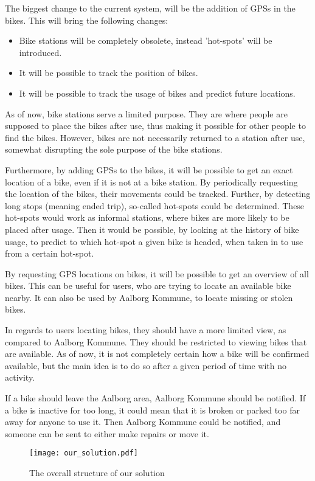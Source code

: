 The biggest change to the current system, will be the addition of GPSs in the bikes.
This will bring the following changes:
\begin{itemize}
\item Bike stations will be completely obsolete, instead 'hot-spots' will be introduced.
\item It will be possible to track the position of bikes.
\item It will be possible to track the usage of bikes and predict future locations.
\end{itemize}

As of now, bike stations serve a limited purpose.
They are where people are supposed to place the bikes after use, thus making it possible for other people to find the bikes.
However, bikes are not necessarily returned to a station after use, somewhat disrupting the sole purpose of the bike stations.

Furthermore, by adding GPSs to the bikes, it will be possible to get an exact location of a bike, even if it is not at a bike station.
By periodically requesting the location of the bikes, their movements could be tracked.
Further, by detecting long stops (meaning ended trip), so-called hot-spots could be determined.
These hot-spots would work as informal stations, where bikes are more likely to be placed after usage.
Then it would be possible, by looking at the history of bike usage, to predict to which hot-spot a given bike is headed, when taken in to use from a certain hot-spot.

By requesting GPS locations on bikes, it will be possible to get an overview of all bikes.
This can be useful for users, who are trying to locate an available bike nearby.
It can also be used by Aalborg Kommune, to locate missing or stolen bikes.

In regards to users locating bikes, they should have a more limited view, as compared to Aalborg Kommune.
They should be restricted to viewing bikes that are available.
As of now, it is not completely certain how a bike will be confirmed available, but the main idea is to do so after a given period of time with no activity.

If a bike should leave the Aalborg area, Aalborg Kommune should be notified.
If a bike is inactive for too long, it could mean that it is broken or parked too far away for anyone to use it.
Then Aalborg Kommune could be notified, and someone can be sent to either make repairs or move it.

\begin{figure}
\texttt{[image: our\_solution.pdf]}
\caption{The overall structure of our solution}
\end{figure}
